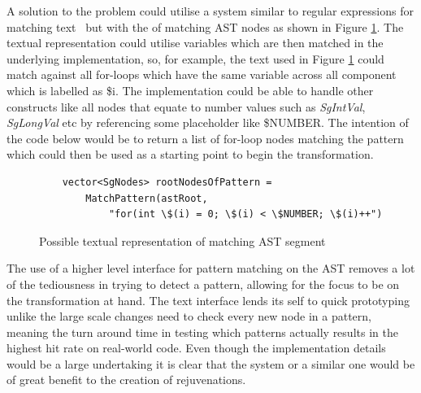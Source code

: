 \documentclass[bsc,frontabs,singlespacing,twoside,parskip,deptreport]{infthesis}
\begin{document}
A solution to the problem could utilise a system similar to regular expressions for matching text~\cite{Aho:1992:FCS:114768} but with the of matching AST nodes as shown in  Figure \ref{fig:adv-ast-matching}. The textual representation could utilise variables which are then matched in the underlying implementation, so, for example, the text used in Figure \ref{fig:adv-ast-matching} could match against all for-loops which have the same variable across all component which is labelled as \$i. The implementation could be able to handle other constructs like all nodes that equate to number values such as \textit{SgIntVal}, \textit{SgLongVal} etc by referencing some placeholder like \$NUMBER. The intention of the code below would be to return a list of for-loop nodes matching the pattern which could then be used as a starting point to begin the transformation.

 \begin{figure}[H]
    \centering
    \begin{verbatim}
    vector<SgNodes> rootNodesOfPattern =
        MatchPattern(astRoot,
            "for(int \$(i) = 0; \$(i) < \$NUMBER; \$(i)++")
    \end{verbatim}
    \caption{Possible textual representation of matching AST segment}
    \label{fig:adv-ast-matching}
\end{figure}

The use of a higher level interface for pattern matching on the AST removes a lot of the tediousness in trying to detect a pattern, allowing for the focus to be on the transformation at hand. The text interface lends its self to quick prototyping unlike the large scale changes need to check every new node in a pattern, meaning the turn around time in testing which patterns actually results in the highest hit rate on real-world code. Even though the implementation details would be a large undertaking it is clear that the system or a similar one would be of great benefit to the creation of rejuvenations.

    




\end{document}
